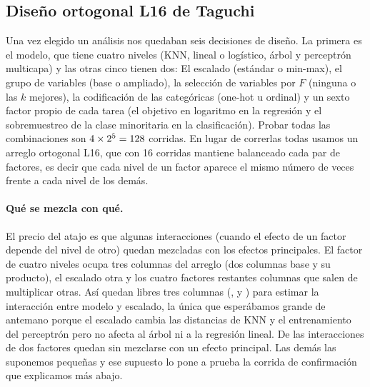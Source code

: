 

\begin{table}[!htbp]
\centering
\small
{}
\caption{Muestras por bloque temporal, contadas sobre todas las muestras
limpias por fecha de recepción: Cada análisis tiene su propia unidad (en la
regresión son días hábiles) pero todos respetan los mismos cortes.}
\label{tab:particion}
\end{table}

\subsection{Diseño ortogonal L16 de Taguchi}
\label{sec:taguchi}

Una vez elegido un análisis nos quedaban seis decisiones de diseño. La
primera es el modelo, que tiene cuatro niveles (KNN, lineal o logístico,
árbol y perceptrón multicapa) y las otras cinco tienen dos: El escalado
(estándar o min-max), el grupo de variables (base o ampliado), la selección
de variables por $F$ (ninguna o las $k$ mejores), la codificación de las
categóricas (one-hot u ordinal) y un sexto factor propio de cada tarea (el
objetivo en logaritmo en la regresión y el sobremuestreo de la clase
minoritaria en la clasificación). Probar todas las combinaciones son
$4\times 2^5=128$ corridas. En lugar de correrlas todas
usamos un arreglo ortogonal L16, que con 16 corridas mantiene balanceado cada
par de factores, es decir que cada nivel de un factor aparece el mismo número
de veces frente a cada nivel de los demás.

\paragraph{Qué se mezcla con qué.} El precio del atajo es que algunas
interacciones (cuando el efecto de un factor depende del nivel de otro)
quedan mezcladas con los efectos principales. El factor de cuatro niveles
ocupa tres columnas del arreglo (dos columnas base y su producto), el
escalado otra y los cuatro factores restantes columnas que salen de
multiplicar otras. Así quedan libres tres columnas (, 
y ) para estimar la interacción entre modelo y escalado, la única
que esperábamos grande de antemano porque el escalado cambia las distancias
de KNN y el entrenamiento del perceptrón pero no afecta al árbol ni a la
regresión lineal. De las \RegInteracciones{} interacciones de dos factores
\RegInteraccionesLibres{} quedan sin mezclarse con un efecto principal. Las
demás las suponemos pequeñas y ese supuesto lo pone a prueba la corrida de
confirmación que explicamos más abajo.

